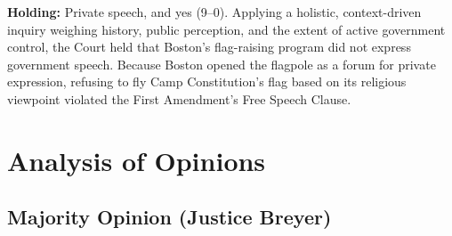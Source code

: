\documentclass[12pt]{article}
\begin{document}
\textbf{Holding:} Private speech, and yes (9--0). Applying a holistic, context-driven inquiry weighing history, public perception, and the extent of active government control, the Court held that Boston's flag-raising program did not express government speech. Because Boston opened the flagpole as a forum for private expression, refusing to fly Camp Constitution's flag based on its religious viewpoint violated the First Amendment's Free Speech Clause.

\section{Analysis of Opinions}
\subsection{Majority Opinion (Justice Breyer)}
\end{document}
